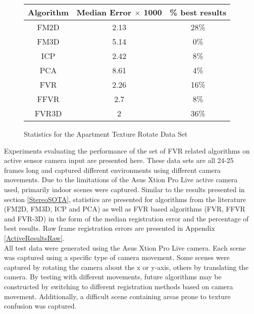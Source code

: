 

\begin{figure}
\centering
\begin{tabular}{ccc}
\hline
\textbf{Algorithm} & \textbf{Median Error $\times$ 1000} & \textbf{\% best results}\\ \hline
FM2D	& 2.13 & 28\%\\
FM3D	& 5.14 & 0\%\\
ICP	& 2.42 & 8\%\\
PCA	& 8.61 & 4\%\\
FVR	& 2.26 & 16\%\\
FFVR	& 2.7 & 8\%\\
FVR3D	& 2 & 36\%\\
\end{tabular}
\caption{Statistics for the Apartment Texture Rotate Data Set}
\label{tab:apartmenttexturerotate}
\end{figure} 


Experiments evaluating the performance of the set of FVR related algorithms on active sensor camera input are presented here. These data sets are all 24-25 frames long and captured different environments using different camera movements. Due to the limitations of the Asus Xtion Pro Live active camera used, primarily indoor scenes were captured. Similar to the results presented in section \ref{StereoSOTA}, statistics are presented for algorithms from the literature (FM2D, FM3D, ICP and PCA) as well as FVR based algorithms (FVR, FFVR and FVR-3D) in the form of the median registration error and the percentage of best results. Raw frame registration errors are presented in Appendix \ref{ActiveResultsRaw}. \\

All test data were generated using the Asus Xtion Pro Live camera. Each scene was captured using a specific type of camera movement. Some scenes were captured by rotating the camera about the x or y-axis, others by translating the camera. By testing with different movements, future algorithms may be constructed by switching to different registration methods based on camera movement. Additionally, a difficult scene containing areas prone to texture confusion was captured. \\

